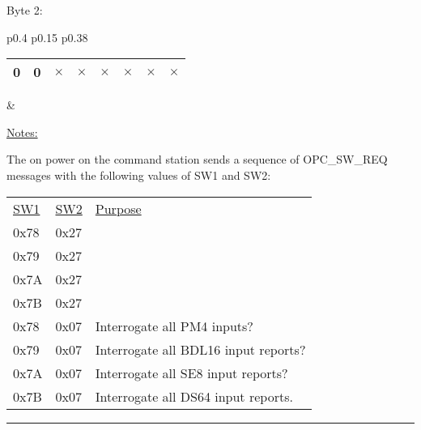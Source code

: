 Byte 2:

\begin{tabular}{p{0.4\linewidth} p{0.15\linewidth} p{0.38\linewidth}} 

\begin{tabular}{|p{0.3cm}|p{0.3cm}|p{0.3cm}|p{0.3cm}|p{0.3cm}|p{0.3cm}|p{0.3cm}|p{0.3cm}|}
\hline
0 & 0 & $\times$ & $\times$ & $\times$ & $\times$ & $\times$ & $\times$\\
\hline
\end{tabular}
& \\
\end{tabular}

\underline{Notes:} 

The on power on the command station sends a sequence of OPC\_SW\_REQ messages with the following values of SW1 and SW2:

\begin{tabular}{l l l}
\underline{SW1} & \underline{SW2} & \underline{Purpose}\\
0x78 & 0x27\\
0x79 & 0x27\\
0x7A & 0x27\\
0x7B & 0x27\\
0x78 & 0x07 & Interrogate all PM4 inputs?\\
0x79 & 0x07 & Interrogate all BDL16 input reports?\\
0x7A & 0x07 & Interrogate all SE8 input reports?\\
0x7B & 0x07 & Interrogate all DS64 input reports.\\
\end{tabular}

\rule{15.1cm}{0.4pt}
